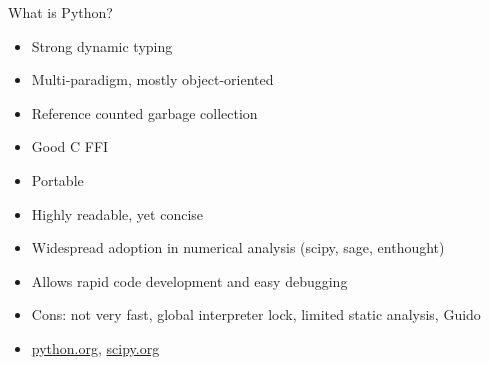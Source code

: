 \begin{frame}{What is Python?}
  \begin{itemize}
  \item Strong dynamic typing
  \item Multi-paradigm, mostly object-oriented
  \item Reference counted garbage collection
  \item Good C FFI
  \item Portable
  \item Highly readable, yet concise
  \item Widespread adoption in numerical analysis (scipy, sage, enthought)
  \item Allows rapid code development and easy debugging
  \item Cons: not very fast, global interpreter lock, limited static analysis, Guido
  \item \url{python.org}, \url{scipy.org}
  \end{itemize}
\end{frame}

